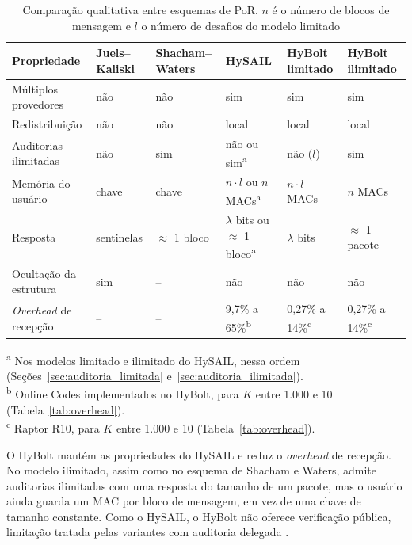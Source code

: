 \begin{table}[htbp]
	\centering
	\caption{Comparação qualitativa entre esquemas de \acrshort{PoR}. $n$ é o número de blocos de mensagem e $l$ o número de desafios do modelo limitado}
	\label{tab:comparacao_por}
	\footnotesize
	\begin{tabular}{@{}p{3.3cm}p{2.1cm}p{2.1cm}p{2.0cm}p{2.0cm}p{2.1cm}@{}}
		\hline
		\textbf{Propriedade} & \textbf{Juels--Kaliski} & \textbf{Shacham--Waters} & \textbf{HySAIL} & \textbf{HyBolt limitado} & \textbf{HyBolt ilimitado} \\
		\hline
		Múltiplos provedores & não & não & sim & sim & sim \\
		Redistribuição & não & não & local & local & local \\
		Auditorias ilimitadas & não & sim & não ou sim\textsuperscript{a} & não ($l$) & sim \\
		Memória do usuário & chave & chave & $n \cdot l$ ou $n$ \acrshort{MAC}s\textsuperscript{a} & $n \cdot l$ \acrshort{MAC}s & $n$ \acrshort{MAC}s \\
		Resposta & sentinelas & $\approx$ 1 bloco & $\lambda$ bits ou $\approx$ 1 bloco\textsuperscript{a} & $\lambda$ bits & $\approx$ 1 pacote \\
		Ocultação da estrutura & sim & -- & não & não & não \\
		\emph{Overhead} de recepção & -- & -- & 9,7\% a 65\%\textsuperscript{b} & 0,27\% a 14\%\textsuperscript{c} & 0,27\% a 14\%\textsuperscript{c} \\
		\hline
	\end{tabular}

	\footnotesize\raggedright
	\textsuperscript{a} Nos modelos limitado e ilimitado do HySAIL, nessa ordem (Seções~\ref{sec:auditoria_limitada} e~\ref{sec:auditoria_ilimitada}).\\
	\textsuperscript{b} Online Codes implementados no HyBolt, para $K$ entre 1.000 e 10 (Tabela~\ref{tab:overhead}).\\
	\textsuperscript{c} Raptor R10, para $K$ entre 1.000 e 10 (Tabela~\ref{tab:overhead}).
\end{table}

O HyBolt mantém as propriedades do HySAIL e reduz o \emph{overhead} de recepção. No modelo ilimitado, assim como no esquema de Shacham e Waters, admite auditorias ilimitadas com uma resposta do tamanho de um pacote, mas o usuário ainda guarda um \acrshort{MAC} por bloco de mensagem, em vez de uma chave de tamanho constante. Como o HySAIL, o HyBolt não oferece verificação pública, limitação tratada pelas variantes com auditoria delegada \cite{armknecht2021outsourcing,shen2024public}.
